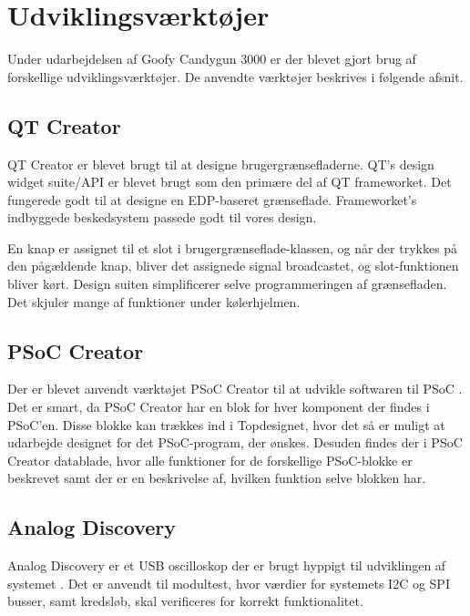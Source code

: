 \chapter{Udviklingsværktøjer}
Under udarbejdelsen af Goofy Candygun 3000 er der blevet gjort brug af forskellige udviklingsværktøjer. De anvendte værktøjer beskrives i følgende afsnit.
\section{QT Creator}
QT Creator \cite{QTCreator} er blevet brugt til at designe brugergrænsefladerne. QT's design widget suite/API er blevet brugt som den primære del af QT frameworket. Det fungerede godt til at designe en EDP-baseret grænseflade. Frameworket's indbyggede beskedsystem passede godt til vores design. \newline 

\noindent En knap er assignet til et slot i brugergrænseflade-klassen, og når der trykkes på den pågældende knap, bliver det assignede signal broadcastet, og slot-funktionen bliver kørt. Design suiten simplificerer selve programmeringen af grænsefladen. Det skjuler mange af funktioner under kølerhjelmen. 

\section{PSoC Creator}
Der er blevet anvendt værktøjet PSoC Creator til at udvikle softwaren til PSoC \cite{PSoC}. Det er smart, da PSoC Creator har en blok for hver komponent der findes i PSoC'en. Disse blokke kan trækkes ind i Topdesignet, hvor det så er muligt at udarbejde designet for det PSoC-program, der ønskes. Desuden findes der i PSoC Creator datablade, hvor alle funktioner for de forskellige PSoC-blokke er beskrevet samt der er en beskrivelse af, hvilken funktion selve blokken har.

\section{Analog Discovery}
Analog Discovery er et USB oscilloskop der er brugt hyppigt til udviklingen af systemet \cite{Analog}. Det er anvendt til modultest, hvor værdier for systemets I2C og SPI busser, samt kredsløb, skal verificeres for korrekt funktionalitet.
